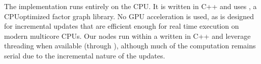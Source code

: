 \documentclass[letterpaper,10pt,english]{sphinxmanual}
\begin{document}
\sphinxAtStartPar
The {\hyperref[\detokenize{glossary:term-iSAM2}]{}} {\hyperref[\detokenize{glossary:term-SLAM}]{}} implementation runs entirely on the CPU. It is written in C++ and uses {\hyperref[\detokenize{glossary:term-GTSAM}]{}}, a CPU\sphinxhyphen{}optimized factor graph library. No GPU acceleration is used, as {\hyperref[\detokenize{glossary:term-iSAM2}]{}} is designed for incremental updates that are efficient enough for real time execution on modern multi\sphinxhyphen{}core CPUs. Our {\hyperref[\detokenize{glossary:term-SLAM}]{}} nodes run within a {\hyperref[\detokenize{glossary:term-ROS-2-Node}]{}} written in C++ and leverage threading when available (through {\hyperref[\detokenize{glossary:term-TBB}]{}}), although much of the computation remains serial due to the incremental nature of the updates.
\end{document}
